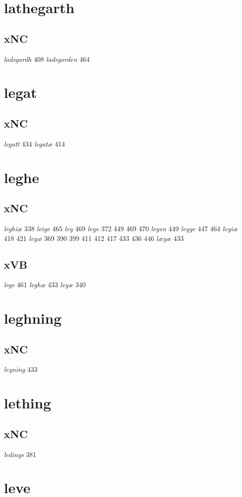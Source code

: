 \documentclass[a4paper,twocolumn]{article}
\begin{document}
\section{lathegarth}
\label{sec:org60fe01b}
\subsection{xNC}
\label{sec:org6fb3c8a}
\emph{ladegardh} 408 \emph{ladegorden} 464 
\section{legat}
\label{sec:org1510153}
\subsection{xNC}
\label{sec:org6dbd32d}
\emph{legatt} 434 \emph{legatæ} 414 
\section{leghe}
\label{sec:org2dc9077}
\subsection{xNC}
\label{sec:org0b4f7ad}
\emph{leghiæ} 338 \emph{leige} 465 \emph{ley} 469 \emph{leye} 372 449 469 470 \emph{leyen} 449 \emph{leyge} 447 464 \emph{leyiæ} 418 421 \emph{leyæ} 369 390 399 411 412 417 433 436 446 \emph{læyæ} 433 
\subsection{xVB}
\label{sec:org47e52a1}
\emph{lege} 461 \emph{leghæ} 433 \emph{leyæ} 340 
\section{leghning}
\label{sec:orgbd5a444}
\subsection{xNC}
\label{sec:orgd3d9c15}
\emph{leyning} 433 
\section{lething}
\label{sec:org7101766}
\subsection{xNC}
\label{sec:org5d115f3}
\emph{ledings} 381 
\section{leve}
\label{sec:org2f4d39b}
\end{document}
